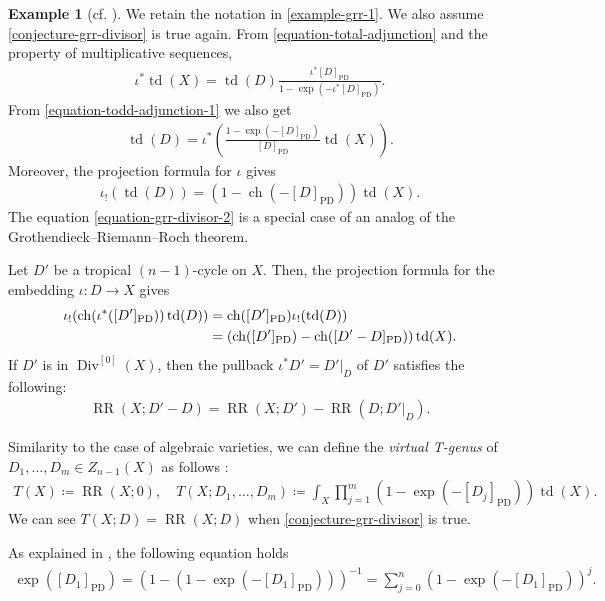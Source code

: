 \documentclass[a4paper,dvipdfmx,reqno,12pt]{amsart}
\theoremstyle{definition}
\newtheorem{example}[theorem]{Example}
\newcommand{\deq}{\coloneqq}
\newcommand{\opn}[1]{\operatorname{#1}}
\newcommand{\PD}[1]{[#1]_{\mathrm{PD}}}
\numberwithin{equation}{section}
\begin{document}
\begin{example}[{cf. \cite[Chapter 13 Appendix]{MR2810322}}]
We retain the notation
in \cref{example-grr-1}.
We also assume \cref{conjecture-grr-divisor} is true again.
From \eqref{equation-total-adjunction}
and the property of multiplicative sequences, 
\begin{align}
\label{equation-todd-adjunction-1}
\iota^{*}\opn{td}(X)=
\opn{td}(D)\frac{\iota^{*}\PD{D}}
{1-\opn{exp}(-\iota^{*}\PD{D})}.
\end{align}
From \cref{equation-todd-adjunction-1} we also get
\begin{align}
\opn{td}(D)
=\iota^{*}\left(
\frac{1-\opn{exp}(-\PD{D})}{
\PD{D}}\opn{td}(X)\right).
\end{align}
Moreover, the projection formula for 
$\iota$ gives
\begin{align}
\label{equation-grr-divisor-2}
\iota_!(\opn{td}(D))=(1-\opn{ch}(-\PD{D}))\opn{td}(X).
\end{align}
The equation \eqref{equation-grr-divisor-2} 
is a special case of an analog of 
the Grothendieck--Riemann--Roch theorem.

Let $D'$ be a tropical $(n-1)$-cycle on $X$.
Then, the projection formula for 
the embedding $\iota\colon D\to X$ gives
\begin{align}
\iota_!(\opn{ch}(\iota^{*}(\PD{D'}))\opn{td}(D))
&=\opn{ch}(\PD{D'})\iota_!(\opn{td}(D)) \notag \\
&=(\opn{ch}(\PD{D'})-\opn{ch}(\PD{D'-D}))\opn{td}(X).
\end{align}
If $D'$ is in $\opn{Div}^{[0]}(X)$, then
the pullback $\iota^{*}D'=D'|_{D}$ of $D'$ satisfies
the following:
\begin{align}
\label{equation-rr-number-divisor}
\opn{RR}(X;D'-D)=\opn{RR}(X;D')-
\opn{RR}(D;D'|_{D}).
\end{align}


Similarity to the case of algebraic varieties,
we can define the
\emph{virtual T-genus} of $D_1,\ldots,D_m\in Z_{n-1}(X)$
as follows \cite[]{MR1335917}:
\begin{align}
T(X)\deq \opn{RR}(X;0),\quad  T(X;D_1,\ldots,D_m)\deq
\int_X\prod_{j=1}^{m}(1-\opn{exp}(-\PD{D_j}))\opn{td}(X).
\end{align}
We can see $T(X;D)=\opn{RR}(X;D)$ when
\cref{conjecture-grr-divisor} is true.


As explained in \cite[]{MR1335917},
the following equation holds
\begin{align}
\opn{exp}(\PD{D_1})=(1-(1-\opn{exp}(-\PD{D_1})))^{-1}
=\sum_{j=0}^{n}(1-\opn{exp}(-\PD{D_1}))^j.
\end{align}


\end{example}
\end{document}
